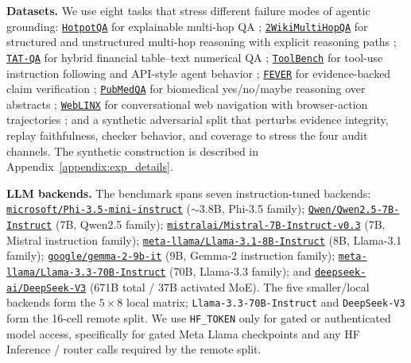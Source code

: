 \noindent\textbf{Datasets.}
We use eight tasks that stress different failure modes of agentic grounding:
\href{https://hotpotqa.github.io/}{\texttt{HotpotQA}} for explainable multi-hop QA
\citep{yang2018hotpotqa};
\href{https://huggingface.co/datasets/framolfese/2WikiMultihopQA}{\texttt{2WikiMultiHopQA}} for
structured and unstructured multi-hop reasoning with explicit reasoning paths
\citep{ho2020constructing};
\href{https://huggingface.co/datasets/next-tat/TAT-QA}{\texttt{TAT-QA}} for hybrid financial
table--text numerical QA \citep{zhu2021tatqa};
\href{https://github.com/OpenBMB/ToolBench}{\texttt{ToolBench}} for tool-use instruction following
and API-style agent behavior \citep{qin2023toollm};
\href{https://huggingface.co/datasets/fever/fever}{\texttt{FEVER}} for evidence-backed claim
verification \citep{thorne2018fever};
\href{https://huggingface.co/datasets/qiaojin/PubMedQA}{\texttt{PubMedQA}} for biomedical
yes/no/maybe reasoning over abstracts \citep{jin2019pubmedqa};
\href{https://huggingface.co/datasets/McGill-NLP/WebLINX}{\texttt{WebLINX}} for conversational
web navigation with browser-action trajectories \citep{lu2024weblinx}; and a synthetic
adversarial split that perturbs evidence integrity, replay faithfulness, checker behavior, and
coverage to stress the four audit channels. The synthetic construction is described in
Appendix~\ref{appendix:exp_details}.

\smallskip
\noindent\textbf{LLM backends.}
The benchmark spans seven instruction-tuned backends:
\href{https://huggingface.co/microsoft/Phi-3.5-mini-instruct}{\texttt{microsoft/Phi-3.5-mini-instruct}}
(\(\sim\)3.8B, Phi-3.5 family);
\href{https://huggingface.co/Qwen/Qwen2.5-7B-Instruct}{\texttt{Qwen/Qwen2.5-7B-Instruct}}
(7B, Qwen2.5 family);
\href{https://huggingface.co/mistralai/Mistral-7B-Instruct-v0.3}{\texttt{mistralai/Mistral-7B-Instruct-v0.3}}
(7B, Mistral instruction family);
\href{https://huggingface.co/meta-llama/Llama-3.1-8B-Instruct}{\texttt{meta-llama/Llama-3.1-8B-Instruct}}
(8B, Llama-3.1 family);
\href{https://huggingface.co/google/gemma-2-9b-it}{\texttt{google/gemma-2-9b-it}}
(9B, Gemma-2 instruction family);
\href{https://huggingface.co/meta-llama/Llama-3.3-70B-Instruct}{\texttt{meta-llama/Llama-3.3-70B-Instruct}}
(70B, Llama-3.3 family); and
\href{https://huggingface.co/deepseek-ai/DeepSeek-V3}{\texttt{deepseek-ai/DeepSeek-V3}}
(671B total / 37B activated MoE). The five smaller/local backends form the \(5\times8\) local
matrix; \texttt{Llama-3.3-70B-Instruct} and \texttt{DeepSeek-V3} form the 16-cell remote split.
We use \texttt{HF\_TOKEN} only for gated or authenticated model access, specifically for gated
Meta Llama checkpoints and any HF Inference / router calls required by the remote split.

